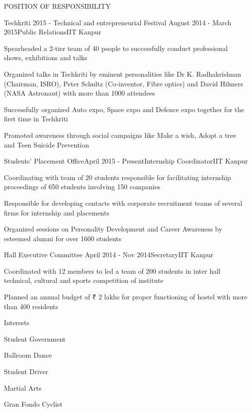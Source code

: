 \documentclass{resume} %
\begin{document}
\begin{rSection}{POSITION OF RESPONSIBILITY}

\begin{rSubsection}{Techkriti 2015 - Technical and entrepreneurial Festival }{August 2014 - March 2015}{Public Relations}{IIT Kanpur}
\item Spearheaded a 2-tier team of 40 people to successfully conduct professional shows, exhibitions and talks
\item Organized talks in Techkriti by eminent personalities like Dr K. Radhakrishnan (Chairman, ISRO), Peter Schultz (Co-inventor, Fibre optics) and David Hilmers (NASA Astronaut) with more than 1000 attendees
\item Successfully organized Auto expo, Space expo and Defence expo together for the first time in Techkriti
\item Promoted awareness through social campaigns like Make a wish, Adopt a tree and Teen Suicide Prevention
\end{rSubsection}


\begin{rSubsection}{Students' Placement Office}{April 2015 - Present}{Internship Coordinator}{IIT Kanpur}
\item Coordinating with team of 20 students responsible for facilitating internship proceedings of 650 students involving 150 companies
 \item Responsible for developing contacts with corporate recruitment teams of several firms for internship and placements 
 \item Organized sessions on Personality Development and Career Awareness by esteemed alumni for over 1600 students
\end{rSubsection}


\begin{rSubsection}{Hall Executive Committee }{April 2014 - Nov 2014}{Secretary}{IIT Kanpur}
\item Coordinated with 12 members to led a team of 200 students in inter hall technical, cultural and sports competition of institute 
\item Planned an annual budget of ₹ 2 lakhs for proper functioning of hostel with more than 400 residents
\end{rSubsection}

\end{rSection}
\fi
\begin{rSection}{Interests} \itemsep -3pt
\item Student Government
\item Ballroom Dance
\item Student Driver
\item Martial Arts
\item Gran Fondo Cyclist

\end{rSection}
\end{document}

